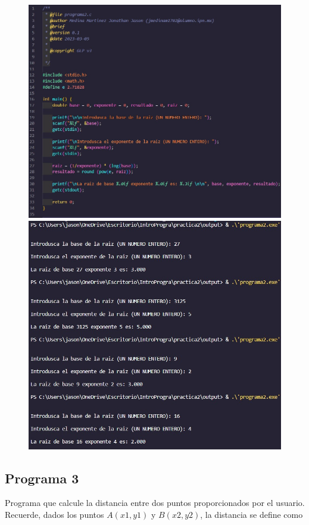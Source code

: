 \documentclass{article}
\begin{document}
\begin{figure}[H]
    \centering
    \includegraphics[width = 12cm]{img2.jpg}
    \includegraphics[width = 12cm]{img2a.jpg}
\end{figure}

\subsection{Programa 3}

Programa que calcule la distancia entre dos puntos proporcionados por el usuario. Recuerde, dados los puntos $A(x1, y1)$ y $B(x2, y2)$, la distancia se define como
\end{document}
